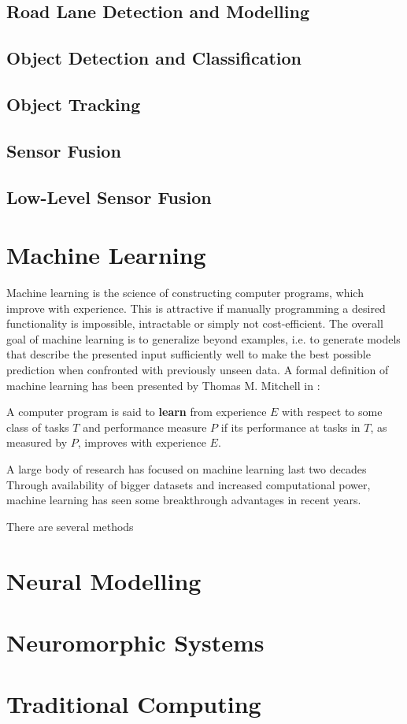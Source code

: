 \subsection{Road Lane Detection and Modelling}
\label{subsec:lane}
\subsection{Object Detection and Classification}
\label{subsec:obj_detect}
\subsection{Object Tracking}
\label{subsec:obj_track}
\subsection{Sensor Fusion}
\label{subsec:sensor_fusion}
\subsection{Low-Level Sensor Fusion}
\section{Machine Learning}
Machine learning is the science of constructing computer programs, which improve with experience. 
This is attractive if manually programming a desired functionality is impossible, intractable or simply not cost-efficient.  
The overall goal of machine learning is to generalize beyond examples, i.e. to generate models that describe the presented input sufficiently well to make the best possible prediction when confronted with previously unseen data.
A formal definition of machine learning has been presented by Thomas M. Mitchell in \cite{Mitchell1997}:

\begin{defn}
A computer program is said to \textbf{learn} from experience $E$ with respect to some class of tasks $T$ and performance measure $P$ if its performance at tasks in $T$, as measured by $P$, improves with experience $E$.
\end{defn}

A large body of research has focused on machine learning last two decades
Through availability of bigger datasets and increased computational power, machine learning has seen some breakthrough advantages in recent years.

There are several methods 
\section{Neural Modelling}
\section{Neuromorphic Systems}
\section{Traditional Computing}